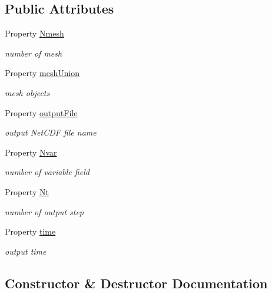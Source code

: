 \subsection*{Public Attributes}
\begin{DoxyCompactItemize}
\item 
Property \hyperlink{class_ndg_post_process_a121c506c8594edeb77255f80029070d1}{Nmesh}
\begin{DoxyCompactList}\small\item\em number of mesh \end{DoxyCompactList}\item 
Property \hyperlink{class_ndg_post_process_ac866eb3ed1f565c92018469cb55ba403}{mesh\+Union}
\begin{DoxyCompactList}\small\item\em mesh objects \end{DoxyCompactList}\item 
Property \hyperlink{class_ndg_post_process_a08853dfa054b39523a379ab3817e648d}{output\+File}
\begin{DoxyCompactList}\small\item\em output Net\+C\+DF file name \end{DoxyCompactList}\item 
Property \hyperlink{class_ndg_post_process_af2926f8de2e1452109e8e56f15349e75}{Nvar}
\begin{DoxyCompactList}\small\item\em number of variable field \end{DoxyCompactList}\item 
Property \hyperlink{class_ndg_post_process_a25cf8ac0ec945656b03c3d74389ba6c4}{Nt}
\begin{DoxyCompactList}\small\item\em number of output step \end{DoxyCompactList}\item 
Property \hyperlink{class_ndg_post_process_a11744c856df74639604e7c8e0761fdd7}{time}
\begin{DoxyCompactList}\small\item\em output time \end{DoxyCompactList}\end{DoxyCompactItemize}


\subsection{Constructor \& Destructor Documentation}
\mbox{\label{class_ndg_post_process_aabd86000ddefc5267769626f1ba7ca9f}} 
